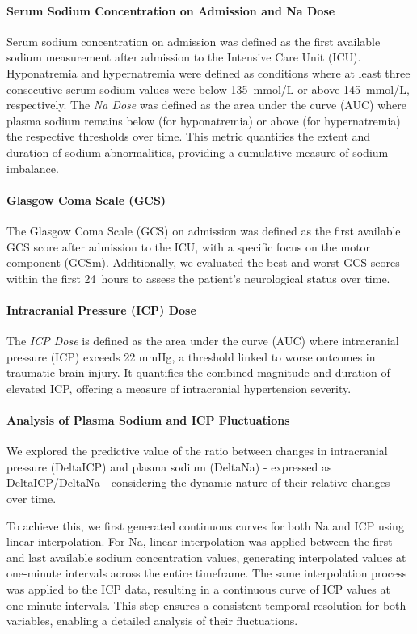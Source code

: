 \paragraph{Serum Sodium Concentration on Admission and Na Dose}

Serum sodium concentration on admission was defined as the first available sodium measurement after admission to the Intensive Care Unit (ICU). Hyponatremia and hypernatremia were defined as conditions where at least three consecutive serum sodium values were below 135~mmol/L or above 145~mmol/L, respectively. The \textit{Na Dose} was defined as the area under the curve (AUC) where plasma sodium remains below (for hyponatremia) or above (for hypernatremia) the respective thresholds over time. This metric quantifies the extent and duration of sodium abnormalities, providing a cumulative measure of sodium imbalance.

\paragraph{Glasgow Coma Scale (GCS)}

The Glasgow Coma Scale (GCS) on admission was defined as the first available GCS score after admission to the ICU, with a specific focus on the motor component (GCSm). Additionally, we evaluated the best and worst GCS scores within the first 24~hours to assess the patient's neurological status over time. 

\paragraph{Intracranial Pressure (ICP) Dose}
The \textit{ICP Dose} is defined as the area under the curve (AUC) where intracranial pressure (ICP) exceeds 22 mmHg, a threshold linked to worse outcomes in traumatic brain injury. It quantifies the combined magnitude and duration of elevated ICP, offering a measure of intracranial hypertension severity.


\paragraph{Analysis of Plasma Sodium and ICP Fluctuations}

We explored the predictive value of the ratio between changes in intracranial pressure (DeltaICP) and plasma sodium (DeltaNa) - expressed as DeltaICP/DeltaNa - considering the dynamic nature of their relative changes over time. 

To achieve this, we first generated continuous curves for both Na and ICP using linear interpolation. For Na, linear interpolation was applied between the first and last available sodium concentration values, generating interpolated values at one-minute intervals across the entire timeframe. The same interpolation process was applied to the ICP data, resulting in a continuous curve of ICP values at one-minute intervals. This step ensures a consistent temporal resolution for both variables, enabling a detailed analysis of their fluctuations.

